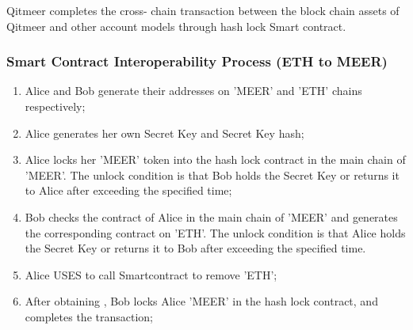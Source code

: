 \documentclass[a4paper,11pt]{article}
\begin{document}
Qitmeer completes the cross- chain transaction between the block chain assets of Qitmeer and  other account models through hash lock Smart contract.

\subsubsection*{Smart Contract Interoperability Process (ETH to MEER)}

\begin{enumerate}
\item  Alice and Bob generate their addresses on 'MEER' and 'ETH' chains respectively;

\item   Alice generates her own Secret Key and Secret Key hash;

 \item  Alice locks her 'MEER' token into the hash lock contract in the main chain of 'MEER'. The unlock condition is that Bob holds the Secret Key or returns it to Alice after exceeding the specified time;

 \item  Bob checks the contract of Alice in the main chain of 'MEER' and generates the corresponding contract on 'ETH'. The unlock condition is that Alice holds the Secret Key or returns it to Bob after exceeding the specified time.

 \item  Alice USES to call Smartcontract to remove 'ETH';

 \item  After obtaining , Bob locks Alice 'MEER' in the hash lock contract, and completes the transaction;

\end{enumerate}


\clearpage



%
%


\end{document}
